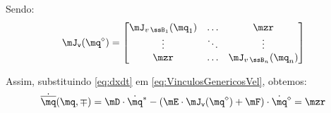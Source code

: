 \documentclass[]{politex}
\begin{document}
Sendo:
\begin{equation}
\mJ_{\mathsf{v}}(\mq^\diamond) =
\begin{bmatrix}
\mJ_{v\,\ssB_1}(\mq_1) & \ldots & \mzr\\
\vdots & \ddots & \vdots\\
\mzr &\ldots  & \mJ_{v\,\ssB_n}(\mq_n)
\end{bmatrix}
\end{equation}

%


Assim, substituindo \eqref{eq:dxdt} em \eqref{eq:VinculosGenericosVel}, obtemos:
\begin{equation} \label{eq:VinculosGenericosVelocidades}
\dot{\overline{\mq}}(\mq,\mp) = \mD \cdot \dot{\mq}^\ast - (\mE \cdot \mJ_{\mathsf{v}}(\mq^\diamond) + \mF) \cdot \dot{\mq}^\diamond = \mzr
\end{equation}
\end{document}
